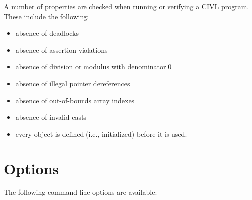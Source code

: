 A number of properties are checked when running or verifying
a CIVL program.  These include the following:
\begin{itemize}
\item absence of deadlocks
\item absence of assertion violations
\item absence of division or modulus with denominator $0$
\item absence of illegal pointer dereferences
\item absence of out-of-bounds array indexes
\item absence of invalid casts
\item every object is defined (i.e., initialized) before
  it is used.
\end{itemize}


\section{Options}

The following command line options are available:

\newenvironment{optionlist}{\begin{flushleft}}{\end{flushleft}}
\newcommand{\option}[2]{#1\\[0mm]\makebox[5mm]{}#2\\[3mm]}
\newcommand{\booloption}[3]{\option{\ct{-#1} or \ct{-#1=}\textit{boolean}
    (default: \ct{#2})}{#3}}
\newcommand{\intoption}[3]{\option{\ct{-#1=}\textit{integer}
    (default: \ct{#2})}{#3}}
\newcommand{\mapoption}[2]{\option{\ct{-#1}\textit{key}\ct{=}\textit{value}}{#2}}
\newcommand{\stringoption}[3]{\option{\ct{-#1=}\textit{string}
    (default: \ct{#2})}{#3}}

